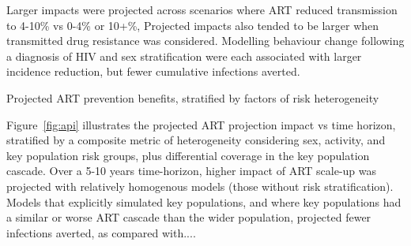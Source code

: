 Larger impacts were projected across scenarios where ART reduced transmission to 4-10\% vs 0-4\% or 10+\%, %
Projected impacts also tended to be larger when transmitted drug resistance was considered. %
Modelling behaviour change following a diagnosis of HIV and sex stratification %
were each associated with larger incidence reduction, but fewer cumulative infections averted. %
\begin{table}
  \caption{Projected ART prevention benefits,
    stratified by factors of risk heterogeneity}
  \centering
  
  \label{tab:api}
\end{table}
\par

Figure~\ref{fig:api} illustrates the projected ART projection impact vs time horizon,
stratified by a composite metric of heterogeneity considering
sex, activity, and key population risk groups, plus differential coverage in the key population cascade. %
Over a 5-10 years time-horizon, higher impact of ART scale-up was projected with relatively homogenous models (those without risk stratification).
Models that explicitly simulated key populations, and where key populations had a similar or worse ART cascade than the wider population, 
projected fewer infections averted, as compared with....

